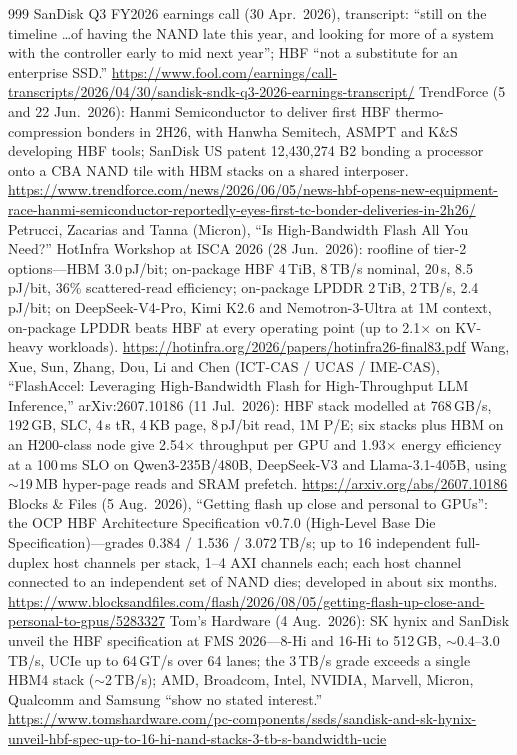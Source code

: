 \begin{thebibliography}{999}
 SanDisk Q3 FY2026 earnings call (30 Apr.\ 2026), transcript: ``still on the timeline \ldots of having the NAND late this year, and looking for more of a system with the controller early to mid next year''; HBF ``not a substitute for an enterprise SSD.'' \url{https://www.fool.com/earnings/call-transcripts/2026/04/30/sandisk-sndk-q3-2026-earnings-transcript/}
 TrendForce (5 and 22 Jun.\ 2026): Hanmi Semiconductor to deliver first HBF thermo-compression bonders in 2H26, with Hanwha Semitech, ASMPT and K\&S developing HBF tools; SanDisk US patent 12,430,274 B2 bonding a processor onto a CBA NAND tile with HBM stacks on a shared interposer. \url{https://www.trendforce.com/news/2026/06/05/news-hbf-opens-new-equipment-race-hanmi-semiconductor-reportedly-eyes-first-tc-bonder-deliveries-in-2h26/}
 Petrucci, Zacarias and Tanna (Micron), ``Is High-Bandwidth Flash All You Need?'' HotInfra Workshop at ISCA 2026 (28 Jun.\ 2026): roofline of tier-2 options---HBM 3.0\,pJ/bit; on-package HBF 4\,TiB, 8\,TB/s nominal, 20\,\textmu s, 8.5\,pJ/bit, 36\% scattered-read efficiency; on-package LPDDR 2\,TiB, 2\,TB/s, 2.4\,pJ/bit; on DeepSeek-V4-Pro, Kimi K2.6 and Nemotron-3-Ultra at 1M context, on-package LPDDR beats HBF at every operating point (up to 2.1$\times$ on KV-heavy workloads). \url{https://hotinfra.org/2026/papers/hotinfra26-final83.pdf}
 Wang, Xue, Sun, Zhang, Dou, Li and Chen (ICT-CAS / UCAS / IME-CAS), ``FlashAccel: Leveraging High-Bandwidth Flash for High-Throughput LLM Inference,'' arXiv:2607.10186 (11 Jul.\ 2026): HBF stack modelled at 768\,GB/s, 192\,GB, SLC, 4\,\textmu s tR, 4\,KB page, 8\,pJ/bit read, 1M P/E; six stacks plus HBM on an H200-class node give 2.54$\times$ throughput per GPU and 1.93$\times$ energy efficiency at a 100\,ms SLO on Qwen3-235B/480B, DeepSeek-V3 and Llama-3.1-405B, using $\sim$19\,MB hyper-page reads and SRAM prefetch. \url{https://arxiv.org/abs/2607.10186}
 Blocks \& Files (5 Aug.\ 2026), ``Getting flash up close and personal to GPUs'': the OCP HBF Architecture Specification v0.7.0 (High-Level Base Die Specification)---grades 0.384 / 1.536 / 3.072\,TB/s; up to 16 independent full-duplex host channels per stack, 1--4 AXI channels each; each host channel connected to an independent set of NAND dies; developed in about six months. \url{https://www.blocksandfiles.com/flash/2026/08/05/getting-flash-up-close-and-personal-to-gpus/5283327}
 Tom's Hardware (4 Aug.\ 2026): SK hynix and SanDisk unveil the HBF specification at FMS 2026---8-Hi and 16-Hi to 512\,GB, $\sim$0.4--3.0\,TB/s, UCIe up to 64\,GT/s over 64 lanes; the 3\,TB/s grade exceeds a single HBM4 stack ($\sim$2\,TB/s); AMD, Broadcom, Intel, NVIDIA, Marvell, Micron, Qualcomm and Samsung ``show no stated interest.'' \url{https://www.tomshardware.com/pc-components/ssds/sandisk-and-sk-hynix-unveil-hbf-spec-up-to-16-hi-nand-stacks-3-tb-s-bandwidth-ucie}

\end{thebibliography}
